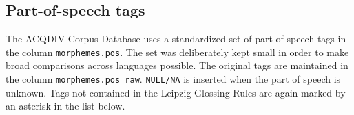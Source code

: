 \documentclass[a4paper, 11pt]{book}
\newcommand{\und}{\underline{{ }}\hspace{0.2mm}}	%
\begin{document}

\subsection{Part-of-speech tags}
\label{subsec:Part-of-speech tags}

The ACQDIV Corpus Database uses a standardized set of part-of-speech tags in the column \texttt{morphemes.pos}. The set was deliberately kept small in order to make broad comparisons across languages possible. The original tags are maintained in the column \texttt{morphemes.pos\und raw}. \texttt{NULL/NA} is inserted when the part of speech is unknown. Tags not contained in the Leipzig Glossing Rules are again marked by an asterisk in the list below.
\end{document}
